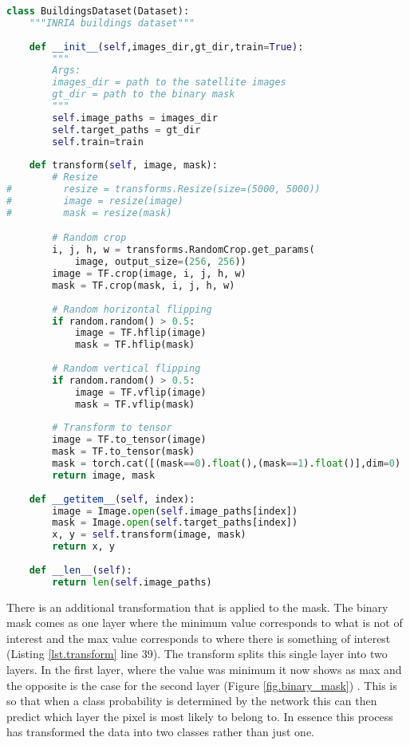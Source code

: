 \begin{lstlisting}[language=Python, caption = Transform Class, label={lst.transform}]
class BuildingsDataset(Dataset):
    """INRIA buildings dataset"""
    
    def __init__(self,images_dir,gt_dir,train=True):
        """
        Args:
        images_dir = path to the satellite images
        gt_dir = path to the binary mask
        """
        self.image_paths = images_dir
        self.target_paths = gt_dir
        self.train=train
        
    def transform(self, image, mask):
        # Resize
#         resize = transforms.Resize(size=(5000, 5000))
#         image = resize(image)
#         mask = resize(mask)

        # Random crop
        i, j, h, w = transforms.RandomCrop.get_params(
            image, output_size=(256, 256))
        image = TF.crop(image, i, j, h, w)
        mask = TF.crop(mask, i, j, h, w)
        
        # Random horizontal flipping
        if random.random() > 0.5:
            image = TF.hflip(image)
            mask = TF.hflip(mask)
            
        # Random vertical flipping
        if random.random() > 0.5:
            image = TF.vflip(image)
            mask = TF.vflip(mask)
            
        # Transform to tensor
        image = TF.to_tensor(image)
        mask = TF.to_tensor(mask)
        mask = torch.cat([(mask==0).float(),(mask==1).float()],dim=0)
        return image, mask
        
    def __getitem__(self, index):
        image = Image.open(self.image_paths[index])
        mask = Image.open(self.target_paths[index])
        x, y = self.transform(image, mask)
        return x, y
        
    def __len__(self):
        return len(self.image_paths)
\end{lstlisting}
There is an additional transformation that is applied to the mask. The binary mask comes as one layer where the minimum value corresponds to what is not of interest and the max value corresponds to where there is something of interest (Listing \ref{lst.transform} line 39). The transform splits this single layer into two layers. In the first layer, where the value was minimum it now shows as max and the opposite is the case for the second layer (Figure \ref{fig.binary_mask}) . This is so that when a class probability is determined by the network this can then predict which layer the pixel is most likely to belong to. In essence this process has transformed the data into two classes rather than just one.
